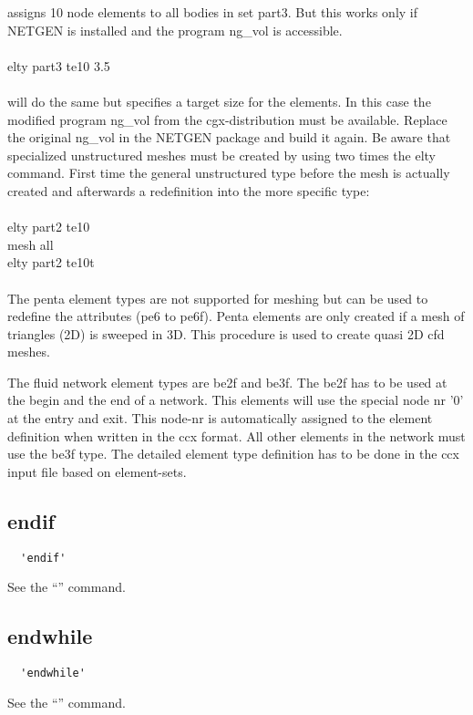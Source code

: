 \documentclass{article}
\begin{document}
assigns 10 node elements to all bodies in set part3. But this works only if NETGEN \cite{NETGEN} is installed and the program ng\_vol is accessible.\\\\
elty part3 te10 3.5\\\\
will do the same but specifies a target size for the elements. In this case the modified program ng\_vol from the cgx-distribution must be available. Replace the original ng\_vol in the NETGEN package and build it again. 
Be aware that specialized unstructured meshes must be created by using two times the elty command. First time the general unstructured type before the mesh is actually created and afterwards a redefinition into the more specific type:\\\\
elty part2 te10\\
mesh all\\
elty part2 te10t\\\\

The penta element types are not supported for meshing but can be used to redefine the attributes (pe6 to pe6f). Penta elements are only created if a mesh of triangles (2D) is sweeped in 3D. This procedure is used to create quasi 2D cfd meshes.

The fluid network element types are be2f and be3f. The be2f has to be used at the begin and the end of a network. This elements will use the special node nr '0' at the entry and exit. This node-nr is automatically assigned to the element definition when written in the ccx format. All other elements in the network must use the be3f type. The detailed element type definition has to be done in the ccx input file based on element-sets.

\subsection{\label{endif}endif}
\begin{verbatim}
  'endif'
\end{verbatim}
See the ``'' command.

\subsection{\label{endwhile}endwhile}
\begin{verbatim}
  'endwhile'
\end{verbatim}
See the ``'' command.
\end{document}
